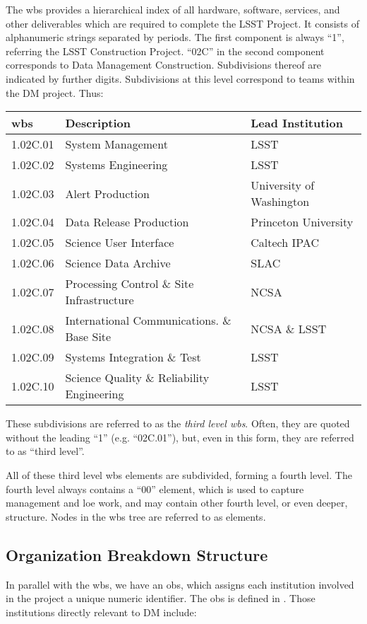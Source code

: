 The \gls{wbs} provides a hierarchical index of all hardware, software, services, and other deliverables which are required to complete the LSST Project.
It consists of alphanumeric strings separated by periods.
The first component is always ``1'', referring the LSST Construction Project.
``02C'' in the second component corresponds to Data Management Construction.
Subdivisions thereof are indicated by further digits.
Subdivisions at this level correspond to teams within the DM project.
Thus:

\begin{longtable}[]{@{}lll@{}}
\hline
\gls{wbs} & Description & Lead Institution\tabularnewline
\hline
\endhead
1.02C.01 & System Management & LSST\tabularnewline
1.02C.02 & Systems Engineering & LSST\tabularnewline
1.02C.03 & Alert Production & University of Washington\tabularnewline
1.02C.04 & Data Release Production & Princeton University\tabularnewline
1.02C.05 & Science User Interface & Caltech IPAC\tabularnewline
1.02C.06 & Science Data Archive & SLAC\tabularnewline
1.02C.07 & Processing Control \& Site Infrastructure & NCSA\tabularnewline
1.02C.08 & International Communications. \& Base Site & NCSA \& LSST\tabularnewline
1.02C.09 & Systems Integration \& Test & LSST\tabularnewline
1.02C.10 & Science Quality \& Reliability Engineering & LSST\tabularnewline
\hline
\end{longtable}

These subdivisions are referred to as the \emph{third level \gls{wbs}}.
Often, they are quoted without the leading ``1'' (e.g. ``02C.01''), but, even in this form, they are referred to as ``third level''.

All of these third level \gls{wbs} \glspl{element} are subdivided, forming a fourth level.
The fourth level always contains a ``00'' \gls{element}, which is used to capture management and \gls{loe} work, and may contain other fourth level, or even deeper, structure.
Nodes in the \gls{wbs} tree are referred to as \glspl{element}.

\subsection{Organization Breakdown
Structure}\label{organization-breakdown-structure}

In parallel with the \gls{wbs}, we have an \gls{obs}, which assigns each institution involved in the project a unique numeric identifier.
The \gls{obs} is defined in .
Those institutions directly relevant to DM include:

